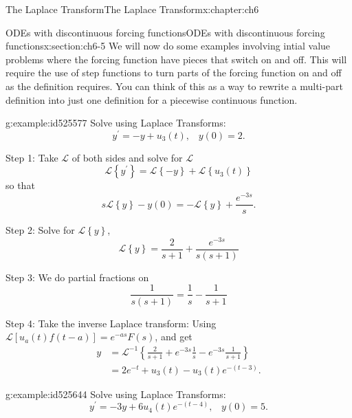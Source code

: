 \documentclass[oneside,10pt,]{book}
\numberwithin{equation}{section}
\numberwithin{equation}{section}
\newcommand{\amp}{&}
\begin{document}
\begin{chapterptx}{The Laplace Transform}{}{The Laplace Transform}{}{}{x:chapter:ch6}
%
\begin{sectionptx}{ODEs with discontinuous forcing functions}{}{ODEs with discontinuous forcing functions}{}{}{x:section:ch6-5}
We will now do some examples involving intial value problems where the forcing function have pieces that switch on and off. This will require the use of step functions to turn parts of the forcing function on and off as the definition requires. You can think of this as a way to rewrite a multi-part definition into just one definition for a piecewise continuous function.%
\begin{example}{}{g:example:id525577}%
Solve using Laplace Transforms:%
\begin{equation*}
y^{\prime}=-y+u_{3}(t),\,\,\,\,\,y(0)=2.
\end{equation*}
%
\par
Step 1: Take \(\mathcal{L}\) of both sides and solve for \(\mathcal{L}\)%
\begin{equation*}
\mathcal{L}\left\{ y^{\prime}\right\} =\mathcal{L}\left\{ -y\right\} +\mathcal{L}\left\{ u_{3}(t)\right\} 
\end{equation*}
so that%
\begin{equation*}
s\mathcal{L}\left\{ y\right\} -y(0)=-\mathcal{L}\left\{ y\right\} +\frac{e^{-3s}}{s}.
\end{equation*}
%
\par
Step 2: Solve for \(\mathcal{L}\left\{ y\right\} \),%
\begin{equation*}
\mathcal{L}\left\{ y\right\} =\frac{2}{s+1}+\frac{e^{-3s}}{s\left(s+1\right)}
\end{equation*}
%
\par
Step 3: We do partial fractions on%
\begin{equation*}
\frac{1}{s\left(s+1\right)}=\frac{1}{s}-\frac{1}{s+1}
\end{equation*}
%
\par
Step 4: Take the inverse Laplace transform: Using \(\mathcal{L}\left[u_{a}(t)f(t-a)\right]=e^{-as}F(s)\), and get%
\begin{align*}
y \amp =\mathcal{L}^{-1}\left\{ \frac{2}{s+1}+e^{-3s}\frac{1}{s}-e^{-3s}\frac{1}{s+1}\right\} \\
\amp =2e^{-t}+u_{3}(t)-u_{3}(t)e^{-\left(t-3\right)}.
\end{align*}
%
\end{example}
\begin{example}{}{g:example:id525644}%
Solve using Laplace Transforms:%
\begin{equation*}
y^{\prime}=-3y+6u_{4}(t)e^{-\left(t-4\right)},\,\,\,\,\,y(0)=5.

\end{equation*}
\end{example}
\end{sectionptx}
\end{chapterptx}
\end{document}
